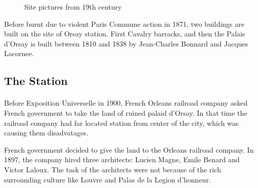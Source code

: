 \documentclass[
10pt, %
a4paper, %
oneside, %
headinclude,footinclude, %
BCOR5mm, %
]{scrartcl}
\theoremstyle{definition} %
\theoremstyle{plain} %
\theoremstyle{remark} %
\begin{document}
\begin{figure}[tbh]
\centering

\label{fig:Palais}
 \quad
{}

\caption[Site pictures]{Site pictures from 19th century} %
\label{fig:Site}
\end{figure}

Before burnt due to violent Paris Commune action in 1871, two buildings are built on the site of Orsay station. First Cavalry barracks, and then the Palais d'Orsay is built between 1810 and 1838 by Jean-Charles Bonnard and Jacques Lacornee. 

\subsection{The Station}

\paragraph{}Before Exposition Universelle in 1900, French Orleans railroad company asked French government to take the land of ruined palaid d'Orsay. In that time the railroad company had far located station from center of the city, which was causing them disadvatages.

French government decided to give the land to the Orleans railroad company. In 1897, the company hired three architects: Lucien Magne, Emile Benard and Victor Laloux. The task of the architects were not because of the rich surrounding culture like Louvre and Palas de la Legion d'honneur. 
\end{document}

